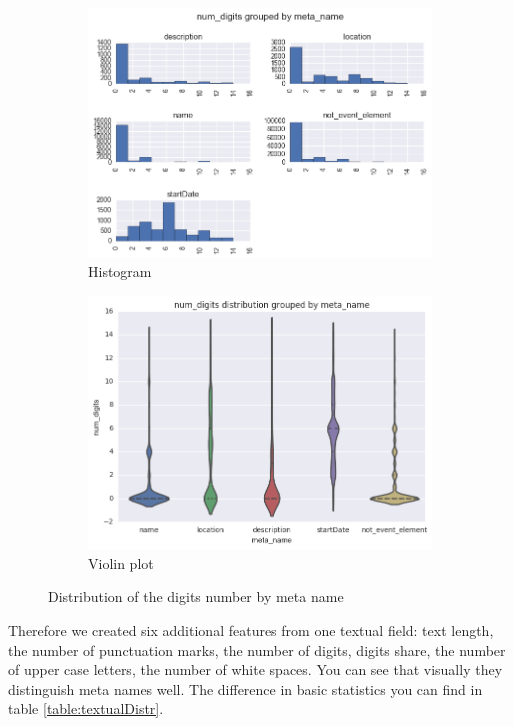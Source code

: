 \begin{figure}[h]
\begin{subfigure}{.5\textwidth}
  \centering
  \includegraphics[width=1\textwidth]{figures07/distrDigitsByMeta}
  \caption{Histogram}
\end{subfigure}
\begin{subfigure}{.5\textwidth}
  \centering
  \includegraphics[width=1\textwidth]{figures07/distrDigitsByMeta_violin}
  \caption{Violin plot}
\end{subfigure}
\caption{Distribution of the digits number by meta name}
\label{fig:distrDigitsByMeta}
\end{figure}

Therefore we created six additional features from one textual field: text length, the number of punctuation marks, the number of digits, digits share, the number of upper case letters, the number of white spaces. You can see that visually they distinguish meta names well. The difference in basic statistics you can find in table \ref{table:textualDistr}. \\

